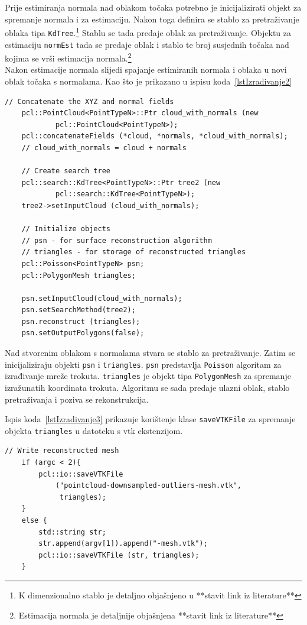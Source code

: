 Prije estimiranja normala nad oblakom točaka potrebno je inicijalizirati
objekt za spremanje normala i za estimaciju. Nakon toga definira se
stablo za pretraživanje oblaka tipa \texttt{KdTree}.\footnote{K
dimenzionalno stablo je detaljno objašnjeno u **stavit link iz
literature**} Stablu se tada predaje oblak za pretraživanje. Objektu za
estimaciju \texttt{normEst} tada se predaje oblak i stablo te broj
susjednih točaka nad kojima se vrši estimacija
normala.\footnote{Estimacija normala je detaljnije objašnjena **stavit
link iz literature**}
\\
Nakon estimacije normala slijedi spajanje estimiranih normala i oblaka u
novi oblak točaka s normalama. Kao što je prikazano u ispisu
koda~\ref{lstIzradivanje2}
\begin{lstlisting}[label=lstIzradivanje2,caption={Dio izvornog koda iz
funkcije \texttt{reconstruct\_mesh()} }]
    // Concatenate the XYZ and normal fields
    pcl::PointCloud<PointTypeN>::Ptr cloud_with_normals (new
            pcl::PointCloud<PointTypeN>);
    pcl::concatenateFields (*cloud, *normals, *cloud_with_normals);
    // cloud_with_normals = cloud + normals

    // Create search tree 
    pcl::search::KdTree<PointTypeN>::Ptr tree2 (new
            pcl::search::KdTree<PointTypeN>);
    tree2->setInputCloud (cloud_with_normals);

    // Initialize objects 
    // psn - for surface reconstruction algorithm
    // triangles - for storage of reconstructed triangles
    pcl::Poisson<PointTypeN> psn;
    pcl::PolygonMesh triangles;

    psn.setInputCloud(cloud_with_normals);
    psn.setSearchMethod(tree2);
    psn.reconstruct (triangles);
    psn.setOutputPolygons(false);
\end{lstlisting}

Nad stvorenim oblakom s normalama stvara se stablo za pretraživanje.
Zatim se inicijaliziraju objekti \texttt{psn} i \texttt{triangles}.
\texttt{psn} predstavlja \texttt{Poisson} algoritam za izrađivanje mreže
trokuta. \texttt{triangles} je objekt tipa \texttt{PolygonMesh} za
spremanje izražunatih koordinata trokuta. Algoritmu se sada predaje
ulazni oblak, stablo pretraživanja i poziva se rekonstrukcija.


Ispis koda~\ref{lstIzradivanje3} prikazuje korištenje klase
\texttt{saveVTKFile} za spremanje objekta \texttt{triangles} u datoteku
s vtk ekstenzijom.

\begin{lstlisting}[label=lstIzradivanje3,caption={Dio izvornog koda iz
funkcije \texttt{reconstruct\_mesh()} }]
    // Write reconstructed mesh
    if (argc < 2){
        pcl::io::saveVTKFile
            ("pointcloud-downsampled-outliers-mesh.vtk",
             triangles);
    }
    else {
        std::string str;
        str.append(argv[1]).append("-mesh.vtk");
        pcl::io::saveVTKFile (str, triangles);
    }
\end{lstlisting}


